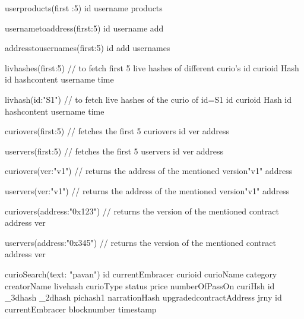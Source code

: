   userproducts(first :5){
	id
	username
	products
  }
  
  usernametoaddress(first:5){
	id
	username
	add
  }
  
  addresstousernames(first:5){
	id
	add
	usernames
  }
  
  livhashes(first:5){  // to fetch first 5 live hashes of different curio's
	id
	curioid
	Hash {
	 id
	 hashcontent
	 username
	 time
	}
  }
  
   livhash(id:"S1"){  // to fetch live hashes of the curio of id=S1
	id
	curioid
	Hash {
	 id
	 hashcontent
	 username
	 time
	}
  }
  
  curiovers(first:5){  // fetches the first 5 curiovers
   id
   ver
   address
  }
  
  uservers(first:5){  // fetches the first 5 uservers
   id
   ver
   address
  }
  
  curiovers(ver:"v1"){  // returns the address of the mentioned version"v1"
   address
  }
  
  uservers(ver:"v1"){  // returns the address of the mentioned version"v1"
   address
  }
  
  curiovers(address:"0x123"){  // returns the version of the mentioned  contract address
   ver
  }
  
  uservers(address:"0x345"){  // returns the version of the mentioned contract address
   ver
  }
  
  curioSearch(text: "pavan") {
    id
  	currentEmbracer
  	curioid
  	curioName
  	category
  	creatorName
  	livehash
  	curioType
  	status
  	price
  	numberOfPassOn
  	curiHsh {
  	  id
	  _3dhash
	  _2dhash
	  pichash1
	  narrationHash
  	}
  	upgradedcontractAddress
  	jrny{
      id
	  currentEmbracer
	  blocknumber
	  timestamp
    }
 }
